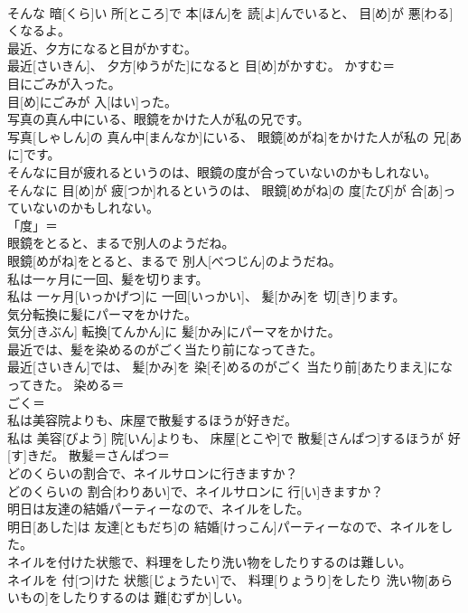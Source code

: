\documentclass[8pt]{extreport}
\begin{document}
\begin{CJK}{UTF8}{min}
\\	そんな 暗[くら]い 所[ところ]で 本[ほん]を 読[よ]んでいると、 目[め]が 悪[わる]くなるよ。	
\\	最近、夕方になると目がかすむ。	
\\	最近[さいきん]、 夕方[ゆうがた]になると 目[め]がかすむ。	かすむ＝ 
\\	目にごみが入った。	
\\	目[め]にごみが 入[はい]った。	
\\	写真の真ん中にいる、眼鏡をかけた人が私の兄です。	
\\	写真[しゃしん]の 真ん中[まんなか]にいる、 眼鏡[めがね]をかけた人が私の 兄[あに]です。	
\\	そんなに目が疲れるというのは、眼鏡の度が合っていないのかもしれない。	
\\	そんなに 目[め]が 疲[つか]れるというのは、 眼鏡[めがね]の 度[たび]が 合[あ]っていないのかもしれない。	
\\	「度」＝ 
\\	眼鏡をとると、まるで別人のようだね。	
\\	眼鏡[めがね]をとると、まるで 別人[べつじん]のようだね。	
\\	私は一ヶ月に一回、髪を切ります。	
\\	私は 一ヶ月[いっかげつ]に 一回[いっかい]、 髪[かみ]を 切[き]ります。	
\\	気分転換に髪にパーマをかけた。	
\\	気分[きぶん] 転換[てんかん]に 髪[かみ]にパーマをかけた。	
\\	最近では、髪を染めるのがごく当たり前になってきた。	
\\	最近[さいきん]では、 髪[かみ]を 染[そ]めるのがごく 当たり前[あたりまえ]になってきた。	染める＝ 
\\	ごく＝ 
\\	私は美容院よりも、床屋で散髪するほうが好きだ。	
\\	私は 美容[びよう] 院[いん]よりも、 床屋[とこや]で 散髪[さんぱつ]するほうが 好[す]きだ。	散髪＝さんぱつ＝ 
\\	どのくらいの割合で、ネイルサロンに行きますか？	
\\	どのくらいの 割合[わりあい]で、ネイルサロンに 行[い]きますか？	
\\	明日は友達の結婚パーティーなので、ネイルをした。	
\\	明日[あした]は 友達[ともだち]の 結婚[けっこん]パーティーなので、ネイルをした。	
\\	ネイルを付けた状態で、料理をしたり洗い物をしたりするのは難しい。	
\\	ネイルを 付[つ]けた 状態[じょうたい]で、 料理[りょうり]をしたり 洗い物[あらいもの]をしたりするのは 難[むずか]しい。	

\end{CJK}
\end{document}
